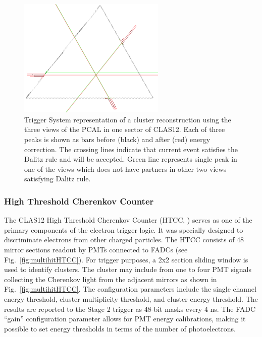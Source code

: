 \begin{figure}[htp]
	\begin{center}
		\centering
		\includegraphics[width=7cm]{img/pcal1.png}
		\caption{Trigger System representation of a cluster reconstruction using the three views of the PCAL in one sector of CLAS12. Each of three peaks is shown as bars before (black) and after (red) energy correction. The crossing lines indicate that current event satisfies the Dalitz rule and will be accepted. Green line represents single peak in one of the views which does not have partners in other two views satisfying Dalitz rule.}
		\label{fig:PCAL}
	\end{center}
\end{figure} 


\subsubsection{High Threshold Cherenkov Counter}
\label{sec:HTCC}

The CLAS12 High Threshold Cherenkov Counter (HTCC, \cite{htcc-ref}) serves as one of the primary components of the electron trigger logic. It was specially designed to discriminate electrons from other charged particles. The HTCC consists of 48 mirror sections readout by PMTs connected to FADCs (see Fig.~\ref{fig:multihitHTCC}). For trigger purposes, a 2x2 section sliding window is used to identify clusters. The cluster may include from one to four PMT signals collecting the Cherenkov light from the adjacent mirrors as shown in  Fig.~\ref{fig:multihitHTCC}. The configuration parameters include the single channel energy threshold, cluster multiplicity threshold, and cluster energy threshold. The results are reported to the Stage 2 trigger as 48-bit masks every 4 ns. The FADC ``gain'' configuration parameter allows for PMT energy calibrations, making it possible to set energy thresholds in terms of the number of photoelectrons.


